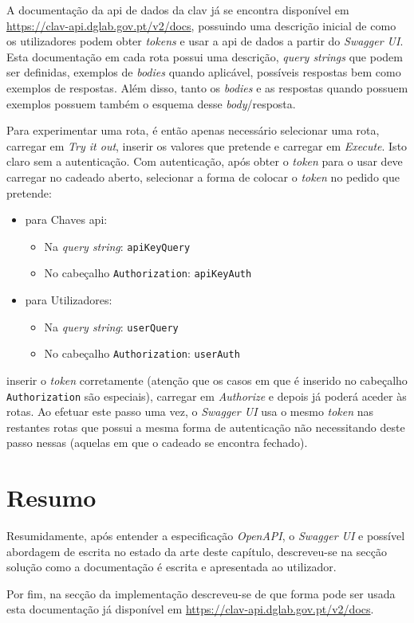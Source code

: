 A documentação da \acrshort{api} de dados da \acrshort{clav} já se encontra disponível em \url{https://clav-api.dglab.gov.pt/v2/docs}, possuindo uma descrição inicial de como os utilizadores podem obter \textit{tokens} e usar a \acrshort{api} de dados a partir do \textit{Swagger UI}. Esta documentação em cada rota possui uma descrição, \textit{query strings} que podem ser definidas, exemplos de \textit{bodies} quando aplicável, possíveis respostas bem como exemplos de respostas. Além disso, tanto os \textit{bodies} e as respostas quando possuem exemplos possuem também o esquema desse \textit{body}/resposta.

Para experimentar uma rota, é então apenas necessário selecionar uma rota, carregar em \textit{Try it out}, inserir os valores que pretende e carregar em \textit{Execute}. Isto claro sem a autenticação. Com autenticação, após obter o \textit{token} para o usar deve carregar no cadeado aberto, selecionar a forma de colocar o \textit{token} no pedido que pretende: 
\begin{itemize}
    \item para Chaves \acrshort{api}:
    \begin{itemize}
        \item Na \textit{query string}: \texttt{apiKeyQuery}
        \item No cabeçalho \texttt{Authorization}: \texttt{apiKeyAuth}
    \end{itemize}
    \item para Utilizadores:
    \begin{itemize}
        \item Na \textit{query string}: \texttt{userQuery}
        \item No cabeçalho \texttt{Authorization}: \texttt{userAuth}
    \end{itemize}
\end{itemize}
inserir o \textit{token} corretamente (atenção que os casos em que é inserido no cabeçalho \texttt{Authorization} são especiais), carregar em \textit{Authorize} e depois já poderá aceder às rotas. Ao efetuar este passo uma vez, o \textit{Swagger UI} usa o mesmo \textit{token} nas restantes rotas que possui a mesma forma de autenticação não necessitando deste passo nessas (aquelas em que o cadeado se encontra fechado).

\section{Resumo}

Resumidamente, após entender a especificação \textit{OpenAPI}, o \textit{Swagger UI} e possível abordagem de escrita no estado da arte deste capítulo,
descreveu-se na secção solução como a documentação é escrita e apresentada ao utilizador. 

Por fim, na secção da implementação descreveu-se de que forma pode ser usada esta documentação já disponível em \url{https://clav-api.dglab.gov.pt/v2/docs}.
